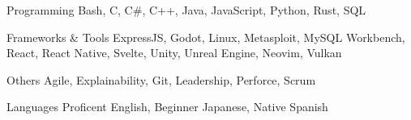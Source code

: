 


\begin{cvskills}

  \cvskill
    {Programming} %
    {Bash, C, C\#, C++, Java, JavaScript, Python, Rust, SQL}

  \cvskill
    {Frameworks \& Tools} %
    {ExpressJS, Godot, Linux, Metasploit, MySQL Workbench, React, React Native, Svelte, Unity, Unreal Engine, Neovim, Vulkan} 

  \cvskill
    {Others} %
    {Agile, Explainability, Git, Leadership, Perforce, Scrum}

  \cvskill
    {Languages} %
    {Proficent English, Beginner Japanese, Native Spanish}

\end{cvskills}
